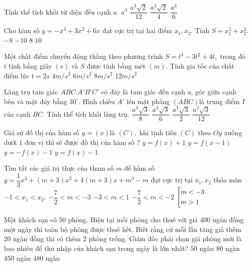 \begin{ex}%
Tính thể tích khối tứ diện đều cạnh $a.$
\choice
{$a^3$}
{\True $\dfrac{a^3\sqrt{2}}{12}$}
{$\dfrac{a^3\sqrt{2}}{4}$}
{$\dfrac{a^3}{6}$}
\end{ex}
\begin{ex}%
Cho hàm số $y=-x^3+3x^2+6x$ đạt cực trị tại hai điểm $x_1, x_2.$ Tính $S=x_1^2+x_2^2.$
\choice
{$-8$}
{$-10$}
{\True $8$}
{$10$}
\end{ex}
\begin{ex}%
Một chất điểm chuyển động thẳng theo phương trình $S=t^3-3t^2+4t,$ trong đó $t$ tính bằng
giây $(s)$ và $S$ được tính bằng mét $(m)$. Tính gia tốc của chất điểm lúc $t=2s$
\choice
{$4m/s^2$}
{\True $6m/s^2$}
{$8m/s^2$}
{$12m/s^2$}
\end{ex}
\begin{ex}%
Lăng trụ tam giác $ABC.A'B'C'$ có đáy là tam giác đều cạnh $a$, góc giữa cạnh bên và mặt
đáy bằng $30^{\circ}$. Hình chiếu $A'$ lên mặt phẳng $(ABC)$là trung điểm $I$ của cạnh $BC$. Tính thể tích khối lăng trụ.
\choice
{\True$\dfrac{a^3\sqrt{3}}{8}$}
{ $\dfrac{a^3\sqrt{3}}{6}$}
{$\dfrac{a^3\sqrt{3}}{2}$}
{$\dfrac{a^3\sqrt{3}}{12}$}
\end{ex}
\begin{ex}%
Giả sử đồ thị của hàm số $y=(x)$là $(C),$ khi tịnh tiến $(C)$ theo $Oy$ xuống dưới $1$ đơn vị
thì sẽ được đồ thị của hàm số ?
\choice
{$y=f(x)+1$}
{ $y=f(x-1)$}
{$y=-f(x)-1$}
{\True$y=f(x)-1$}
\end{ex}
\begin{ex}%
Tìm tất các giá trị thực của tham số $m$ để hàm số $y=\dfrac{1}{3}x^3+(m+3)x^2+4(m+3)x+m^3-m$ đạt cực trị tại $x_1, x_2$ thỏa mãn $-1<x_1<x_2$.
\choice
{\True $-\dfrac{7}{2}<m<-3$}
{ $-3<m<1$}
{$-\dfrac{7}{2}<m<-2$}
{$\left[\begin{aligned}&m<-3\\&m>1\end{aligned}\right.$}
\end{ex}
\begin{ex}%
Một khách sạn có $50$ phòng. Hiện tại mỗi phòng cho thuê với giá $400$ ngàn đồng một ngày
thì toàn bộ phòng được thuê hết. Biết rằng cứ mỗi lần tăng giá thêm $20$ ngàn đồng thì có
thêm $2$ phòng trống. Giám đốc phải chọn giá phòng mới là bao nhiêu để thu nhập của
khách sạn trong ngày là lớn nhất?
\choice
{$50$ ngàn}
{ $80$ ngàn}
{\True $450$ ngàn}
{$480$ ngàn}
\end{ex}
